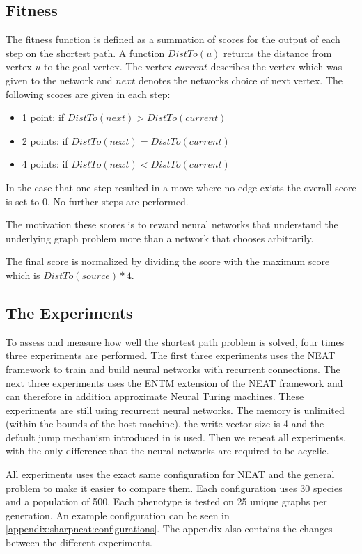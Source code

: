 \subsection{Fitness}
The fitness function is defined as a summation of scores for the output of each step on the shortest path. A function $ DistTo(u) $ returns the distance from vertex $ u $ to the goal vertex. The vertex $ current $ describes the vertex which was given to the network and $ next $ denotes the networks choice of next vertex. The following scores are given in each step:

\begin{itemize}
	\item[] 1 point: if $ DistTo(next) > DistTo(current) $
	\item[] 2 points: if $ DistTo(next) = DistTo(current) $
	\item[] 4 points: if $ DistTo(next) < DistTo(current) $
\end{itemize}

\noindent In the case that one step resulted in a move where no edge exists the overall score is set to 0. No further steps are performed.

\newpar The motivation these scores is to reward neural networks that understand the underlying graph problem more than a network that chooses arbitrarily.

\newpar The final score is normalized by dividing the score with the maximum score which is $ DistTo(source)*4 $.

\subsection{The Experiments}
To assess and measure how well the shortest path problem is solved, four times three experiments are performed. The first three experiments uses the NEAT framework to train and build neural networks with recurrent connections. The next three experiments uses the ENTM extension of the NEAT framework and can therefore in addition approximate Neural Turing machines. These experiments are still using recurrent neural networks. The memory is unlimited (within the bounds of the host machine), the write vector size is 4 and the default jump mechanism introduced in \cite{luders2017continual} is used. Then we repeat all experiments, with the only difference that the neural networks are required to be acyclic.

\newpar All experiments uses the exact same configuration for NEAT and the general problem to make it easier to compare them. Each configuration uses 30 species and a population of 500. Each phenotype is tested on 25 unique graphs per generation. An example configuration can be seen in \autoref{appendix:sharpneat:configurations}. The appendix also contains the changes between the different experiments.


